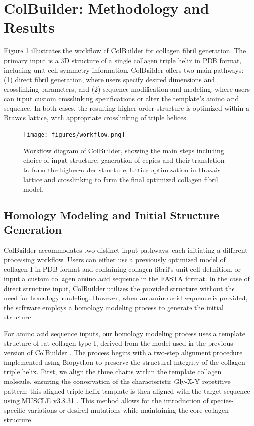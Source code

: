 \documentclass[10pt,letterpaper]{article}
\begin{document}
\section*{ColBuilder: Methodology and Results}\label{sec2}

Figure \ref{fig:colbuilder-workflow} illustrates the workflow of ColBuilder for collagen fibril generation. The primary input is a 3D structure of a single collagen triple helix in PDB format, including unit cell symmetry information. ColBuilder offers two main pathways: (1) direct fibril generation, where users specify desired dimensions and crosslinking parameters, and (2) sequence modification and modeling, where users can input custom crosslinking specifications or alter the template's amino acid sequence. In both cases, the resulting higher-order structure is optimized within a Bravais lattice, with appropriate crosslinking of triple helices.

\begin{figure}[!t]
    \centering
    \texttt{[image: figures/workflow.png]}
    \caption{Workflow diagram of ColBuilder, showing the main steps including choice of input structure, generation of copies and their translation to form the higher-order structure, lattice optimization in Bravais lattice and crosslinking to form the final optimized collagen fibril model.}
    \label{fig:colbuilder-workflow}
\end{figure}

\subsection*{Homology Modeling and Initial Structure Generation}\label{subsec1}

ColBuilder accommodates two distinct input pathways, each initiating a different processing workflow. Users can either use a previously optimized model of collagen I in PDB format and containing collagen fibril's unit cell definition, or input a custom collagen amino acid sequence in the FASTA format. In the case of direct structure input, ColBuilder utilizes the provided structure without the need for homology modeling. However, when an amino acid sequence is provided, the software employs a homology modeling process to generate the initial structure.

For amino acid sequence inputs, our homology modeling process uses a template structure of rat collagen type I, derived from the model used in the previous version of ColBuilder \cite{obarska2021colbuilder}. The process begins with a two-step alignment procedure implemented using Biopython \cite{Cock2009} to preserve the structural integrity of the collagen triple helix. First, we align the three chains within the template collagen molecule, ensuring the conservation of the characteristic Gly-X-Y repetitive pattern; this aligned triple helix template is then aligned with the target sequence using MUSCLE v3.8.31 \cite{Edgar2004}. This method allows for the introduction of species-specific variations or desired mutations while maintaining the core collagen structure.
\end{document}
